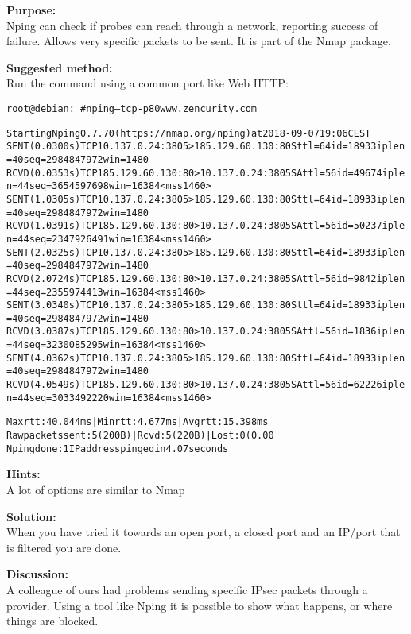 \documentclass[a4paper,11pt,notitlepage]{report}
\begin{document}
{\bf Purpose:}\\
Nping can check if probes can reach through a network, reporting success of failure. Allows very specific packets to be sent. It is part of the Nmap package.

{\bf Suggested method:}\\
Run the command using a common port like Web HTTP:
\begin{alltt}\footnotesize
root@debian:~# nping --tcp -p 80 www.zencurity.com

Starting Nping 0.7.70 ( https://nmap.org/nping ) at 2018-09-07 19:06 CEST
SENT (0.0300s) TCP 10.137.0.24:3805 > 185.129.60.130:80 S ttl=64 id=18933 iplen=40  seq=2984847972 win=1480
RCVD (0.0353s) TCP 185.129.60.130:80 > 10.137.0.24:3805 SA ttl=56 id=49674 iplen=44  seq=3654597698 win=16384 <mss 1460>
SENT (1.0305s) TCP 10.137.0.24:3805 > 185.129.60.130:80 S ttl=64 id=18933 iplen=40  seq=2984847972 win=1480
RCVD (1.0391s) TCP 185.129.60.130:80 > 10.137.0.24:3805 SA ttl=56 id=50237 iplen=44  seq=2347926491 win=16384 <mss 1460>
SENT (2.0325s) TCP 10.137.0.24:3805 > 185.129.60.130:80 S ttl=64 id=18933 iplen=40  seq=2984847972 win=1480
RCVD (2.0724s) TCP 185.129.60.130:80 > 10.137.0.24:3805 SA ttl=56 id=9842 iplen=44  seq=2355974413 win=16384 <mss 1460>
SENT (3.0340s) TCP 10.137.0.24:3805 > 185.129.60.130:80 S ttl=64 id=18933 iplen=40  seq=2984847972 win=1480
RCVD (3.0387s) TCP 185.129.60.130:80 > 10.137.0.24:3805 SA ttl=56 id=1836 iplen=44  seq=3230085295 win=16384 <mss 1460>
SENT (4.0362s) TCP 10.137.0.24:3805 > 185.129.60.130:80 S ttl=64 id=18933 iplen=40  seq=2984847972 win=1480
RCVD (4.0549s) TCP 185.129.60.130:80 > 10.137.0.24:3805 SA ttl=56 id=62226 iplen=44  seq=3033492220 win=16384 <mss 1460>

Max rtt: 40.044ms | Min rtt: 4.677ms | Avg rtt: 15.398ms
Raw packets sent: 5 (200B) | Rcvd: 5 (220B) | Lost: 0 (0.00%)
Nping done: 1 IP address pinged in 4.07 seconds
\end{alltt}

{\bf Hints:} \\
A lot of options are similar to Nmap

{\bf Solution:}\\
When you have tried it towards an open port, a closed port and an IP/port that is filtered you are done.

{\bf Discussion:}\\
A colleague of ours had problems sending specific IPsec packets through a provider. Using a tool like Nping it is possible to show what happens, or where things are blocked.
\end{document}
